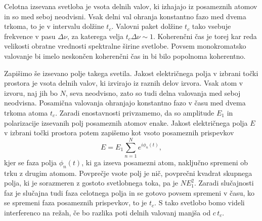 Celotna izsevana svetloba je vsota delnih valov, ki izhajajo iz posameznih
atomov in so med seboj neodvisni. Vsak delni val ohranja konstantno fazo
med dvema trkoma, to je v intervalu dolžine $t_{c}$. Valovni paket dolžine 
$t_{c}$ tako vsebuje frekvence v pasu $\Delta \nu$,
za katerega velja $t_{c}\Delta\nu\sim1$. Koherenčni čas je torej
kar reda velikosti obratne vrednosti spektralne širine svetlobe. Povsem
monokromatsko valovanje bi imelo neskončen koherenčni čas in bi bilo
popolnoma koherentno.

Zapišimo še izsevano polje takega svetila. 
Jakost električnega polja v izbrani točki prostora je vsota delnih
valov, ki izvirajo iz raznih delov izvora. Vsak atom v izvoru, naj
jih bo $N$, seva neodvisno, zato so tudi delna valovanja med seboj
neodvisna. Posamična valovanja ohranjajo konstantno fazo v času med
dvema trkoma atoma $t_{c}$. Zaradi enostavnosti privzamemo,
da so amplitude $E_{1}$ in polarizacije izsevanih polj posameznih atomov enake. 
Jakost električnega polja $E$ v izbrani točki prostora potem 
zapišemo kot vsoto posameznih prispevkov
\begin{equation}
E=E_{1}\sum_{n=1}^{N}e^{i\phi_{n}(t)},
\label{eq:amplituda-random}
\end{equation}
kjer se faza polja $\phi_{n}(t)$, ki ga izseva posamezni atom, naključno
spremeni ob trku z drugim atomom. Povprečje vsote polj je nič, 
povprečni kvadrat skupnega polja, ki je sorazmeren
z gostoto svetlobnega toka, pa je $NE_{1}^{2}$. Zaradi slučajnosti faz je 
slučajna tudi faza celotnega polja in se gotovo povsem spremeni v času, ko se
spremeni faza posameznih prispevkov, to je $t_{c}$. S tako svetlobo bomo videli 
interferenco na režah, če bo razlika poti delnih valovanj manjša od $c\, t_{c}$.

